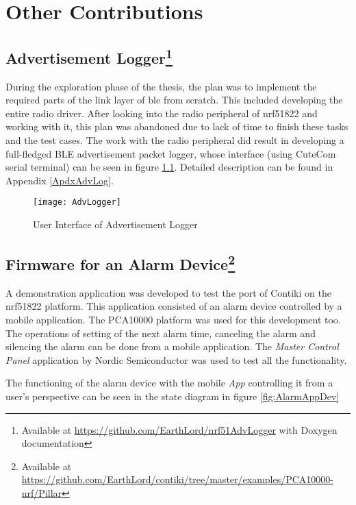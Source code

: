 \chapter{Other Contributions} \label{8OtherContri}

\section[Advertisement Logger]{Advertisement Logger\footnote{Available at \url{https://github.com/EarthLord/nrf51AdvLogger} with Doxygen documentation}} \label{8AdvLogger}

During the exploration phase of the thesis, the plan was to implement the required parts of the link layer of \gls{ble} from scratch. This included developing the entire radio driver. After looking into the radio peripheral of nrf51822 and working with it, this plan was abandoned due to lack of time to finish these tasks and the test cases. The work with the radio peripheral did result in developing a full-fledged BLE advertisement packet logger, whose interface (using CuteCom serial terminal) can be seen in figure \ref{fig:UIAdvLogger}. Detailed description can be found in Appendix \ref{ApdxAdvLog}. 

\begin{figure}[h]
\centering
\texttt{[image: AdvLogger]}
\caption{User Interface of Advertisement Logger}
\label{fig:UIAdvLogger}
\vspace{-5pt}
\end{figure}

\section[Firmware for an Alarm Device]{Firmware for an Alarm Device\footnote{Available at \url{https://github.com/EarthLord/contiki/tree/master/examples/PCA10000-nrf/Pillar}}}

A demonstration application was developed to test the port of Contiki on the nrf51822 platform. This application consisted of an alarm device controlled by a mobile application. The PCA10000 platform was used for this development too. The operations of setting of the next alarm time, canceling the alarm and  silencing the alarm can be done from a mobile application. The \emph{Master Control Panel} application by Nordic Semiconductor was used to test all the functionality.

The functioning of the alarm device with the mobile \emph{App} controlling it from a user's perspective can be seen in the state diagram in figure \ref{fig:AlarmAppDev}

